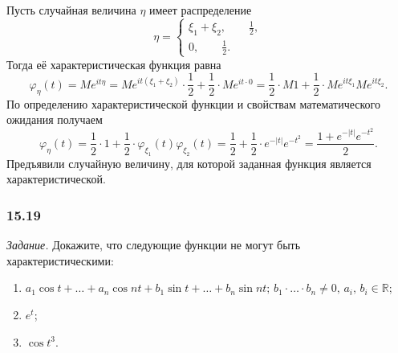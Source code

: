 \begin{enumerate}[label=\alph*)]
Пусть случайная величина $ \eta $ имеет распределение
$$ \eta =
  \begin{cases}
    \xi_1 + \xi_2, \qquad \frac{1}{2}, \\
    0, \qquad \frac{1}{2}.
  \end{cases}$$
Тогда её характеристическая функция равна
$$ \varphi_{ \eta } \left( t \right) =
  Me^{it \eta } =
  Me^{it \left( \xi_1 + \xi_2 \right) } \cdot \frac{1}{2} + \frac{1}{2} \cdot Me^{it \cdot 0} =
  \frac{1}{2} \cdot M1 + \frac{1}{2} \cdot Me^{it \xi_1} Me^{it \xi_2}.$$
По определению характеристической функции и свойствам математического ожидания получаем
$$ \varphi_{ \eta } \left( t \right) =
  \frac{1}{2} \cdot 1 +
  \frac{1}{2} \cdot \varphi_{ \xi_1} \left( t \right) \varphi_{ \xi_2} \left( t \right) =
  \frac{1}{2} + \frac{1}{2} \cdot e^{- \left| t \right| }e^{- t^2} =
  \frac{1 + e^{- \left| t \right| }e^{- t^2}}{2}.$$
Предъявили случайную величину, для которой заданная функция является характеристической.
\end{enumerate}

\subsubsection*{15.19}

\textit{Задание.} Докажите, что следующие функции не могут быть характеристическими:
\begin{enumerate}[label=\alph*)]
\item
  $a_1 \cos t + \dotsc + a_n \cos nt + b_1 \sin t + \dotsc + b_n \sin nt; \,
  b_1 \cdot \dotsc \cdot b_n \neq 0, \, a_i, \, b_i \in \mathbb{R}$;
\item $e^t$;
\item $ \cos t^3$.
\end{enumerate}

